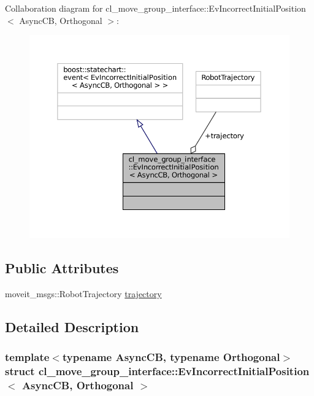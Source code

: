 Collaboration diagram for cl\+\_\+move\+\_\+group\+\_\+interface\+:\+:Ev\+Incorrect\+Initial\+Position$<$ Async\+CB, Orthogonal $>$\+:
\nopagebreak
\begin{figure}[H]
\begin{center}
\leavevmode
\includegraphics[width=350pt]{structcl__move__group__interface_1_1EvIncorrectInitialPosition__coll__graph}
\end{center}
\end{figure}
\subsection*{Public Attributes}
\begin{DoxyCompactItemize}
\item 
moveit\+\_\+msgs\+::\+Robot\+Trajectory \hyperlink{structcl__move__group__interface_1_1EvIncorrectInitialPosition_a5e8e161fe0d22db3bd7b4d71fae3f23d}{trajectory}
\end{DoxyCompactItemize}


\subsection{Detailed Description}
\subsubsection*{template$<$typename Async\+CB, typename Orthogonal$>$\newline
struct cl\+\_\+move\+\_\+group\+\_\+interface\+::\+Ev\+Incorrect\+Initial\+Position$<$ Async\+C\+B, Orthogonal $>$}



